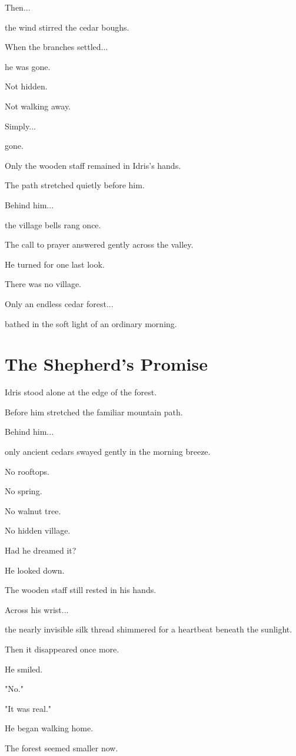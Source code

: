 \documentclass[12pt,openany]{book}
\begin{document}
Then...

the wind stirred the cedar boughs.

When the branches settled...

he was gone.

Not hidden.

Not walking away.

Simply...

gone.

Only the wooden staff remained in Idris's hands.

The path stretched quietly before him.

Behind him...

the village bells rang once.

The call to prayer answered gently across the valley.

He turned for one last look.

There was no village.

Only an endless cedar forest...

bathed in the soft light of an ordinary morning.
\section*{The Shepherd's Promise}

Idris stood alone at the edge of the forest.

Before him stretched the familiar mountain path.

Behind him...

only ancient cedars swayed gently in the morning breeze.

No rooftops.

No spring.

No walnut tree.

No hidden village.

Had he dreamed it?

He looked down.

The wooden staff still rested in his hands.

Across his wrist...

the nearly invisible silk thread shimmered for a heartbeat beneath the sunlight.

Then it disappeared once more.

He smiled.

"No."

"It was real."

He began walking home.

The forest seemed smaller now.
\end{document}
